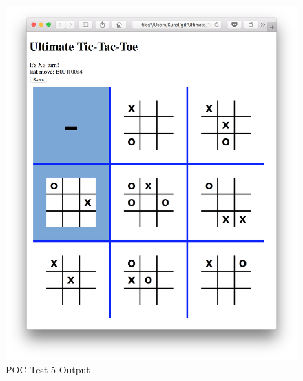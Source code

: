 \documentclass[12pt, titlepage]{article}
\begin{document}
\begin{figure}
  \includegraphics[width=\linewidth]{Figures/Test5-output.png}
  \caption{POC Test 5 Output}
  \label{fig:Test5_output}
\end{figure}
\end{document}
